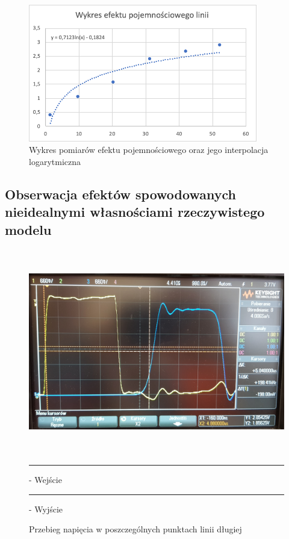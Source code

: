 \documentclass[a4paper,12pt]{article}
\newcommand\crule[3][black]{\textcolor{#1}{\rule{#2}{#3}}}
\begin{document}
\begin{justify}
\begin{figure}[h]
\centering
\includegraphics[width=10cm, height=6cm]{2_c_wykr}
\caption{Wykres pomiarów efektu pojemnościowego oraz jego interpolacja logarytmiczna}
\end{figure}



\newpage

\subsection{Obserwacja efektów spowodowanych nieidealnymi własnościami rzeczywistego modelu }

\begin{figure}[h]
\centering
\includegraphics[width=15cm, height=9cm]{3}
\caption{Przebieg napięcia w poszczególnych punktach linii długiej}
\crule[yellow]{1cm}{0.4cm} - Wejście \\
\crule[blue]{1cm}{0.4cm} - Wyjście \\
\end{figure}


\end{justify}
\end{document}
